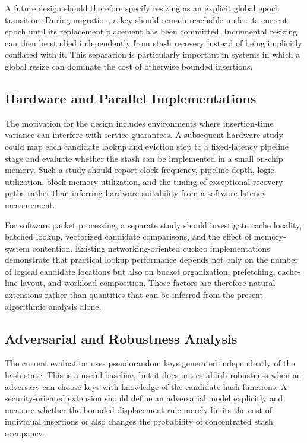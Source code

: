 \documentclass[conference]{IEEEtran}
\begin{document}
A future design should therefore specify resizing as an explicit global epoch transition. During migration, a key should remain reachable under its current epoch until its replacement placement has been committed. Incremental resizing can then be studied independently from stash recovery instead of being implicitly conflated with it. This separation is particularly important in systems in which a global resize can dominate the cost of otherwise bounded insertions.

\subsection{Hardware and Parallel Implementations}

The motivation for the design includes environments where insertion-time variance can interfere with service guarantees. A subsequent hardware study could map each candidate lookup and eviction step to a fixed-latency pipeline stage and evaluate whether the stash can be implemented in a small on-chip memory. Such a study should report clock frequency, pipeline depth, logic utilization, block-memory utilization, and the timing of exceptional recovery paths rather than inferring hardware suitability from a software latency measurement.

For software packet processing, a separate study should investigate cache locality, batched lookup, vectorized candidate comparisons, and the effect of memory-system contention. Existing networking-oriented cuckoo implementations demonstrate that practical lookup performance depends not only on the number of logical candidate locations but also on bucket organization, prefetching, cache-line layout, and workload composition. Those factors are therefore natural extensions rather than quantities that can be inferred from the present algorithmic analysis alone.

\subsection{Adversarial and Robustness Analysis}

The current evaluation uses pseudorandom keys generated independently of the hash state. This is a useful baseline, but it does not establish robustness when an adversary can choose keys with knowledge of the candidate hash functions. A security-oriented extension should define an adversarial model explicitly and measure whether the bounded displacement rule merely limits the cost of individual insertions or also changes the probability of concentrated stash occupancy.
\end{document}
